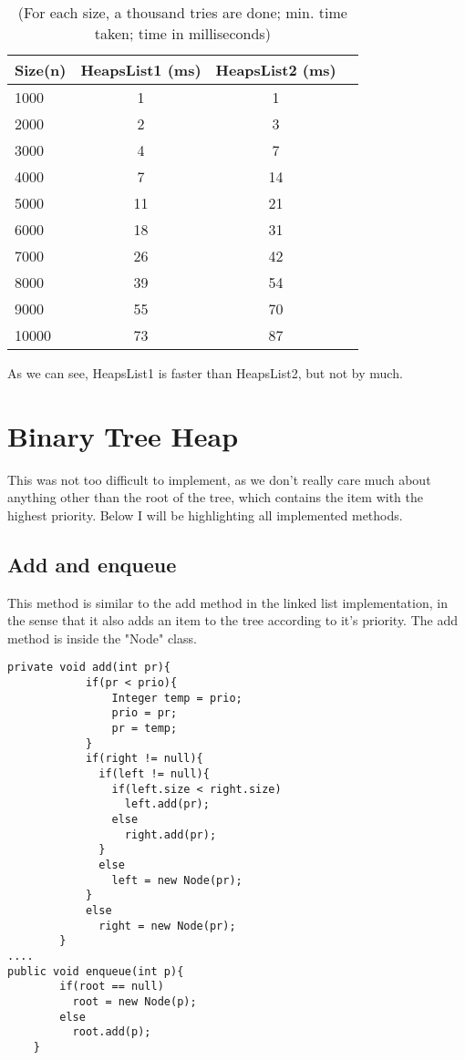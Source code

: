 \documentclass[a4paper,11pt]{article}
\begin{document}
\begin{table}[h]
\begin{center}
\begin{tabular}{l|c|c|c}
\textbf{Size(n)} & \textbf{HeapsList1 (ms)} & \textbf{HeapsList2 (ms)}\\
\hline
  1000      &  1     &  1\\
  2000      &  2     &  3\\
  3000      &  4     &  7\\
  4000      &  7     &  14\\
  5000      &  11     &  21\\
  6000      &  18     &  31\\
  7000      &  26     &  42\\
  8000      &  39     &  54\\
  9000      &  55     &  70\\
  10000      &  73     &  87\\
\end{tabular}
\caption{(For each size, a thousand tries are done; min. time taken; time in milliseconds)}
\label{tab:table1}
\end{center}
\end{table}

As we can see, HeapsList1 is faster than HeapsList2, but not by much. 

\section*{Binary Tree Heap}
This was not too difficult to implement, as we don't really care much about anything other than the root of the tree, which contains the item with the highest priority. Below I will be highlighting all implemented methods.

\subsection*{Add and enqueue}
This method is similar to the add method in the linked list implementation, in the sense that it also adds an item to the tree according to it's priority. The add method is inside the "Node" class.

\begin{verbatim}
private void add(int pr){
            if(pr < prio){
                Integer temp = prio;
                prio = pr;
                pr = temp;
            }
            if(right != null){
              if(left != null){
                if(left.size < right.size)
                  left.add(pr);
                else
                  right.add(pr);
              }
              else 
                left = new Node(pr);
            }
            else
              right = new Node(pr);
        }
....
public void enqueue(int p){
        if(root == null)
          root = new Node(p);
        else
          root.add(p);
    }
\end{verbatim}
\end{document}
